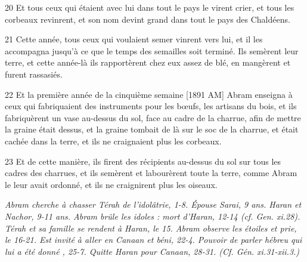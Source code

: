 \par 20 Et tous ceux qui étaient avec lui dans tout le pays le virent crier, et tous les corbeaux revinrent, et son nom devint grand dans tout le pays des Chaldéens.
\par 21 Cette année, tous ceux qui voulaient semer vinrent vers lui, et il les accompagna jusqu'à ce que le temps des semailles soit terminé. Ils semèrent leur terre, et cette année-là ils rapportèrent chez eux assez de blé, en mangèrent et furent rassasiés.
\par 22 Et la première année de la cinquième semaine [1891 AM] Abram enseigna à ceux qui fabriquaient des instruments pour les bœufs, les artisans du bois, et ils fabriquèrent un vase au-dessus du sol, face au cadre de la charrue, afin de mettre la graine était dessus, et la graine tombait de là sur le soc de la charrue, et était cachée dans la terre, et ils ne craignaient plus les corbeaux.
\par 23 Et de cette manière, ils firent des récipients au-dessus du sol sur tous les cadres des charrues, et ils semèrent et labourèrent toute la terre, comme Abram le leur avait ordonné, et ils ne craignirent plus les oiseaux.


\par \textit{Abram cherche à chasser Térah de l'idolâtrie, 1-8. Épouse Sarai, 9 ans. Haran et Nachor, 9-11 ans. Abram brûle les idoles : mort d'Haran, 12-14 (cf. Gen. xi.28). Térah et sa famille se rendent à Haran, le 15. Abram observe les étoiles et prie, le 16-21. Est invité à aller en Canaan et béni, 22-4. Pouvoir de parler hébreu qui lui a été donné , 25-7. Quitte Haran pour Canaan, 28-31. (Cf. Gén. xi.31-xii.3.)}

